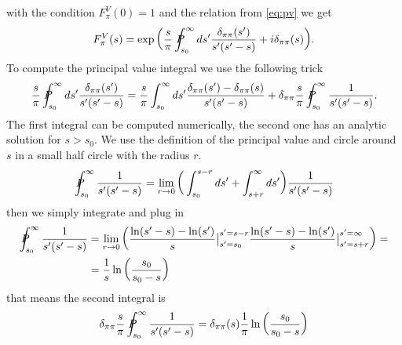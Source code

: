\documentclass[a4paper]{article}
\begin{document}
with the condition $F_\pi^V(0) = 1$ and the relation from \ref{eq:pv} we get
\begin{align}
    F_\pi^V(s) =  \exp
    \bigg(
        \frac{s}{\pi}\PV_{s_0}^\infty ds' \frac{\delta_{\pi\pi}(s')}{s'(s'-s)}
        + i\delta_{\pi\pi}(s)
    \bigg).
\end{align}
To compute the principal value integral we use the following trick
\begin{align}
    \frac{s}{\pi}\PV_{s_0}^\infty ds' \frac{\delta_{\pi\pi}(s')}{s'(s'-s)} =
    \frac{s}{\pi} \int_{s_0}^\infty ds' \frac{\delta_{\pi\pi}(s')
    -\delta_{\pi\pi}(s)}{s'(s'-s)}+
    \delta_{\pi\pi}\frac{s}{\pi}\PV_{s_0}^\infty \frac{1}{s'(s'-s)}.
\end{align}
The first integral can be computed numerically, the second one has an analytic
solution for $s > s_0$. We use the definition of the principal value and circle
around $s$ in a small half circle with the radius $r$.
\begin{align}
    \PV_{s_0}^\infty \frac{1}{s'(s'-s)} = \lim_{\substack{r\rightarrow0}}
    \bigg(
    \int_{s_0}^{s-r}ds'  + \int_{s+r}^{\infty} ds'
    \bigg)\frac{1}{s'(s'-s)}
\end{align}
then we simply integrate and plug in
\begin{align}
    \PV_{s_0}^\infty \frac{1}{s'(s'-s)} &= \lim_{\substack{r\rightarrow 0}}
    \bigg(
    \frac{\ln(s'-s) - \ln(s')}{s}\big|_{s'= s_0}^{s'= s-r}
    \frac{\ln(s'-s)-\ln(s')}{s}\big|_{s'=s+r}^{s'=\infty}
    \bigg) =\\
    &=\frac{1}{s}\ln\left(\frac{s_0}{s_0-s}\right)
\end{align}
that means the second integral is
\begin{align}
    \delta_{\pi\pi}\frac{s}{\pi}\PV_{s_0}^\infty \frac{1}{s'(s'-s)}
    =\delta_{\pi\pi}(s)\frac{1}{\pi} \ln\left(\frac{s_0}{s_0 -s }\right)
\end{align}
\end{document}
